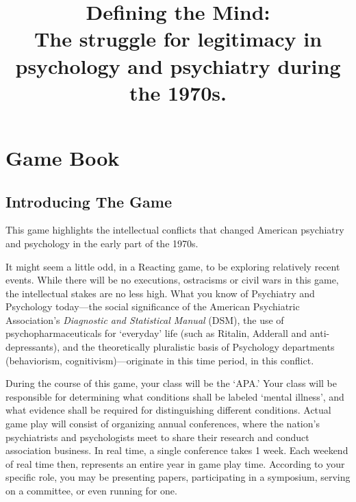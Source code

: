 \pagebreak 

\part{Game Book}
\label{gamebook}


\begin{refsection}
\title{Defining the Mind:\protect\\
\large{The struggle for legitimacy in psychology and psychiatry during the 1970s.}}

\maketitle
\newpage





\frontmatter
\tableofcontents
\newpage
\listoftables
\newpage
\listoffigures
\newpage


\mainmatter

\pagebreak 

\chapter{Introducing The Game}
\label{introducingthegame}

This game highlights the intellectual conflicts that changed American psychiatry and psychology in the early part of the 1970s.

It might seem a little odd, in a Reacting game, to be exploring relatively recent events. While there will be no executions, ostracisms or civil wars in this game, the intellectual stakes are no less high. What you know of Psychiatry and Psychology today---the social significance of the American Psychiatric Association's \emph{Diagnostic and Statistical Manual }(DSM), the use of psychopharmaceuticals for `everyday' life (such as Ritalin, Adderall and anti-depressants), and the theoretically pluralistic basis of Psychology departments (behaviorism, cognitivism)---originate in this time period, in this conflict. 

During the course of this game, your class will be the `APA.' Your class will be responsible for determining what conditions shall be labeled `mental illness', and what evidence shall be required for distinguishing different conditions. Actual game play will consist of organizing annual conferences, where the nation's psychiatrists and psychologists meet to share their research and conduct association business. In real time, a single conference takes 1 week. Each weekend of real time then, represents an entire year in game play time. According to your specific role, you may be presenting papers, participating in a symposium, serving on a committee, or even running for one.


\end{refsection}
